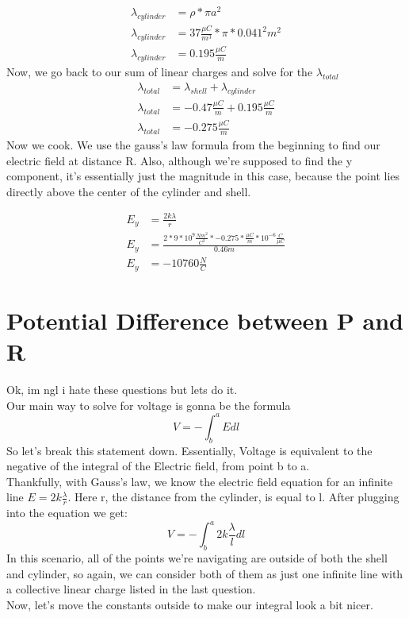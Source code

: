 \documentclass{article}
\begin{document}
\begin{align*}
	\lambda_{cylinder} &= \rho * \pi a^2\\
	\lambda_{cylinder} &= 37 \frac{\mu C}{m^3} * \pi * 0.041^2 m^2\\
\lambda_{cylinder} &=  0.195\frac{\mu C}{m}
\end{align*}
Now, we go back to our sum of linear charges and solve for the $\lambda_{total}$
\begin{align*}
	\lambda_{total} &= \lambda_{shell} + \lambda_{cylinder}\\
	\lambda_{total} &= -0.47 \frac{\mu C}{m} + 0.195 \frac{\mu C}{m}\\
	\lambda_{total} &= -0.275 \frac{\mu C}{m}
\end{align*}
Now we cook. We use the gauss's law formula from the beginning to find our electric field at distance R. Also, although we're supposed to find the y component, it's essentially just the magnitude in this case, because the point lies directly above the center of the cylinder and shell.

\begin{align*}
	E_{y} &= \frac{2k\lambda}{r}\\
	E_{y} &= \frac{2 * 9 * 10^9 \frac{Nm^2}{C^2} * -0.275 * \frac{\mu C}{m} * 10^{-6} \frac{C}{\mu C}}{0.46m}\\
	E_{y} &= -10760\frac{N}{C}
\end{align*}

\section{Potential Difference between P and R}
Ok, im ngl i hate these questions but lets do it.\\
Our main way to solve for voltage is gonna be the formula\\

\[
	V = -\int^a_{b} E dl 
\]
So let's break this statement down. Essentially, Voltage is equivalent to the negative of the integral of the Electric field, from point b to a.\\
Thankfully, with Gauss's law, we know the electric field equation for an infinite line $E = 2k\frac{\lambda}{r}$. Here r, the distance from the cylinder, is equal to l. After plugging into the equation we get:\\
\[
	V = -\int^{a}_{b} 2k\frac{\lambda}{l} dl
\]
In this scenario, all of the points we're navigating are outside of both the shell and cylinder, so again, we can consider both of them as just one infinite line with a collective  linear charge listed in the last question.\\
Now, let's move the constants outside to make our integral look a bit nicer.
\end{document}
